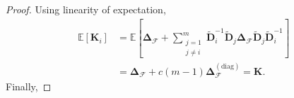 \documentclass[journal,draftcls,onecolumn]{IEEEtran}
\theoremstyle{mystyle}
\newcommand{\bfD}{\mathbf{D}}
\newcommand{\cF}{\mathcal{F}}
\begin{document}
\begin{proof}
Using linearity of expectation, 
\begin{align*}\label{E[k_i]}
\mathbb{E}[\mathbf{K}_i] &= \mathbb{E}\left[ \mathbf{\Delta}_{\mathcal{F}}  +  \sum_{\substack{j = 1 \\ j \neq i}}^m\tilde{\bfD}^{-1}_i\tilde{\bfD}_j\mathbf{\Delta}_{\mathcal{F}}\tilde{\bfD}_j\tilde{\bfD}^{-1}_i \right]\\
& = \mathbf{\Delta}_{\mathcal{F}} + c(m-1) \mathbf{\Delta}^{(\text{diag})}_{\mathcal{F}} = \mathbf{K}.
\end{align*}
Finally,  \nopagebreak[4]



\end{proof}
\end{document}
